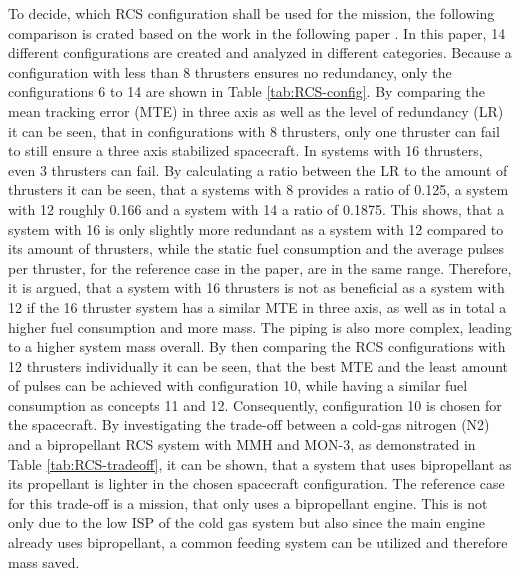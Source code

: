To decide, which RCS configuration shall be used for the mission, the following comparison is crated based on the work in the following paper \cite{Pasand.2017}. In this paper, 14 different configurations are created and analyzed in different categories. Because a configuration with less than 8 thrusters ensures no redundancy, only the configurations 6 to 14 are shown in Table \ref{tab:RCS-config}. By comparing the mean tracking error (MTE) in three axis as well as the level of redundancy (LR) it can be seen, that in configurations with 8 thrusters, only one thruster can fail to still ensure a three axis stabilized spacecraft. In systems with 16 thrusters, even 3 thrusters can fail. By calculating a ratio between the LR to the amount of thrusters it can be seen, that a systems with 8 provides a ratio of 0.125, a system with 12 roughly 0.166 and a system with 14 a ratio of 0.1875. This shows, that a system with 16 is only slightly more redundant as a system with 12 compared to its amount of thrusters, while the static fuel consumption and the average pulses per thruster, for the reference case in the paper, are in the same range. Therefore, it is argued, that a system with 16 thrusters is not as beneficial as a system with 12 if the 16 thruster system has a similar MTE in three axis, as well as in total a higher fuel consumption and more mass. The piping is also more complex, leading to a higher system mass overall. By then comparing the RCS configurations with 12 thrusters individually it can be seen, that the best MTE and the least amount of pulses can be achieved with configuration 10, while having a similar fuel consumption as concepts 11 and 12. Consequently, configuration 10 is chosen for the spacecraft. By investigating the trade-off between a cold-gas nitrogen (N2) and a bipropellant RCS system with MMH and MON-3, as demonstrated in Table \ref{tab:RCS-tradeoff}, it can be shown, that a system that uses bipropellant as its propellant is lighter in the chosen spacecraft configuration. The reference case for this trade-off is a mission, that only uses a bipropellant engine. This is not only due to the low ISP of the cold gas system but also since the main engine already uses bipropellant, a common feeding system can be utilized and therefore mass saved.

